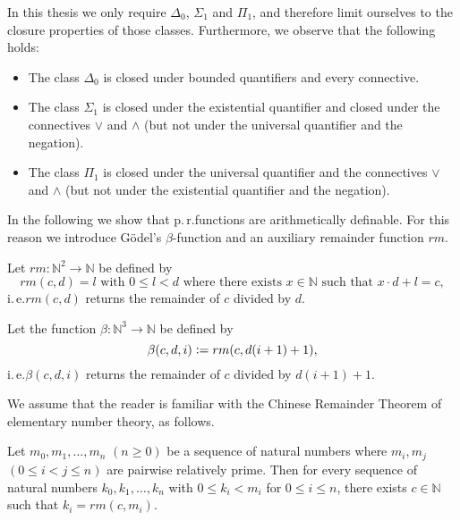 In this thesis we only require $\Delta_0$, $\Sigma_1$ and $\Pi_1$, and therefore limit ourselves to the closure properties of those classes. Furthermore, we observe that the following holds:
\begin{itemize}
\item The class $\Delta_0$ is closed under bounded quantifiers and every connective.
\item The class $\Sigma_1$ is closed under the existential quantifier and closed under the connectives $\vee$ and $\wedge$ (but not under the universal quantifier and the negation).
\item The class $\Pi_1$ is closed under the universal quantifier and the connectives $\vee$ and $\wedge$ (but not under the existential quantifier and the negation).
\end{itemize}

In the following we show that p.\,r.\@ functions are arithmetically definable. For this reason we introduce G\"odel's $\beta$-function and an auxiliary remainder function $\mathit{rm}$.

\begin{dfn}
Let $\mathit{rm}: \mathbb{N}^2 \rightarrow \mathbb{N}$ be defined by
\[\mathit{rm}(c, d) = l \text{ with } 0 \le l < d \text{ where there exists }x \in \mathbb{N} \text{ such that }x \cdot d + l = c,\]
i.\,e.\@ $\mathit{rm}(c,d)$ returns the remainder of $c$ divided by $d$.
\end{dfn}

\begin{dfn}
Let the function $\beta: \mathbb{N}^3 \rightarrow \mathbb{N}$ be defined by 
\[\beta(c,d,i) \vcentcolon= rm(c, d (i+1)+1),\]
i.\,e.\@ $\beta(c,d,i)$ returns the remainder of $c$ divided by $d(i+1)+1$.
\end{dfn}

We assume that the reader is familiar with the Chinese Remainder Theorem of elementary number theory, as follows.

\begin{thm}
Let $m_0,m_1, \ldots, m_n$ $(n \ge 0)$ be a sequence of natural numbers where $m_i, m_j$ $(0 \le i < j \le n)$ are pairwise relatively prime. Then for every sequence of natural numbers $k_0, k_1, \ldots, k_n$ with $0 \le k_i < m_i$ for $0 \le i \le  n$, there exists $c \in \mathbb{N}$ such that $k_i = \mathit{rm}(c,m_i)$.
\end{thm}

